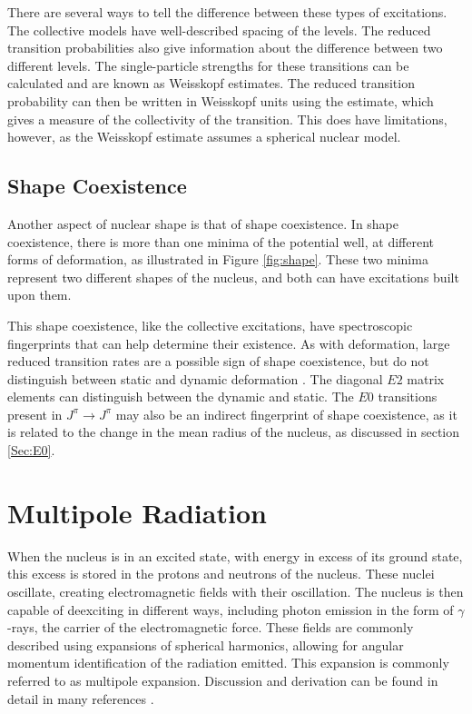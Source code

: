 

There are several ways to tell the difference between these types of excitations. The collective models have well-described spacing of the levels. The reduced transition probabilities also give information about the difference between two different levels. The single-particle strengths for these transitions can be calculated and are known as Weisskopf estimates. The reduced transition probability can then be written in Weisskopf units using the estimate, which gives a measure of the collectivity of the transition. This does have limitations, however, as the Weisskopf estimate assumes a spherical nuclear model.

\subsection{Shape Coexistence}

Another aspect of nuclear shape is that of shape coexistence. In shape coexistence, there is more than one minima of the potential well, at different forms of deformation, as illustrated in Figure \ref{fig:shape}. These two minima represent two different shapes of the nucleus, and both can have excitations built upon them. 



This shape coexistence, like the collective excitations, have spectroscopic fingerprints that can help determine their existence. As with deformation, large reduced transition rates are a possible sign of shape coexistence, but do not distinguish between static and dynamic deformation \citep{heyde11:_shape_coexist}. The diagonal $E2$ matrix elements can distinguish between the dynamic and static. The $E0$ transitions present in $J^{\pi}\rightarrow J^{\pi}$ may also be an indirect fingerprint of shape coexistence, as it is related to the change in the mean radius of the nucleus, as discussed in section \ref{Sec:E0}.

\section{Multipole Radiation}
\label{sec:multipole}
When the nucleus is in an excited state, with energy in excess of its ground state, this excess is stored in the protons and neutrons of the nucleus. These nuclei oscillate, creating electromagnetic fields with their oscillation. The nucleus is then capable of deexciting in different ways, including photon emission in the form of $\gamma$-rays, the carrier of the electromagnetic force. These fields are commonly described using expansions of spherical harmonics, allowing for angular momentum identification of the radiation emitted. This expansion is commonly referred to as multipole expansion. Discussion and derivation can be found in detail in many references \citep{blatt79:_emradiation, jackson99:_emradiation, zangwill13:_emradiation}.

